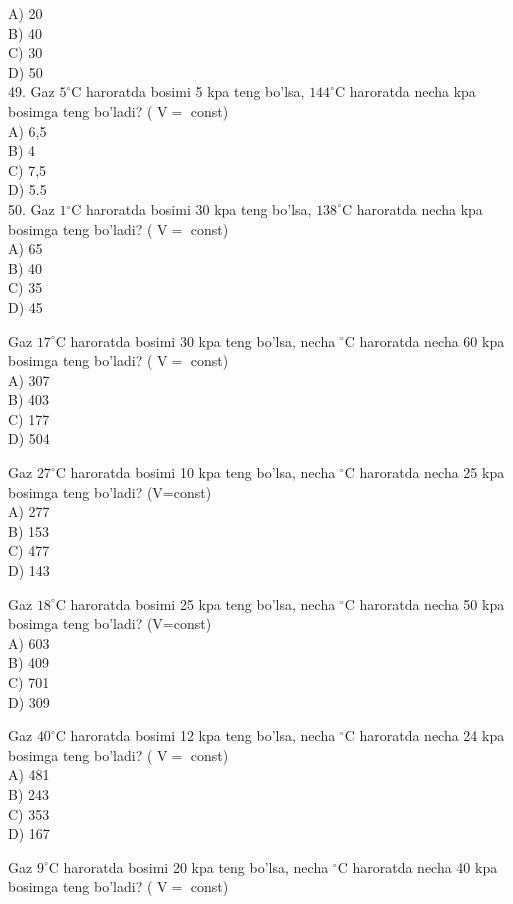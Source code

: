 A) 20\\
B) 40\\
C) 30\\
D) 50\\
49. Gaz $5^{\circ} \mathrm{C}$ haroratda bosimi 5 kpa teng bo'lsa, $144^{\circ} \mathrm{C}$ haroratda necha kpa bosimga teng bo'ladi? ( $\mathrm{V}=$ const)\\
A) 6,5\\
B) 4\\
C) 7,5\\
D) 5.5\\
50. Gaz $1{ }^{\circ} \mathrm{C}$ haroratda bosimi 30 kpa teng bo'lsa, $138^{\circ} \mathrm{C}$ haroratda necha kpa bosimga teng bo'ladi? ( $\mathrm{V}=$ const)\\
A) 65\\
B) 40\\
C) 35\\
D) 45
  \item Gaz $17^{\circ} \mathrm{C}$ haroratda bosimi 30 kpa teng bo'lsa, necha ${ }^{\circ} \mathrm{C}$ haroratda necha 60 kpa bosimga teng bo'ladi? ( $\mathrm{V}=$ const)\\
A) 307\\
B) 403\\
C) 177\\
D) 504\\
  \item Gaz $27^{\circ} \mathrm{C}$ haroratda bosimi 10 kpa teng bo'lsa, necha ${ }^{\circ} \mathrm{C}$ haroratda necha 25 kpa bosimga teng bo'ladi? (V=const)\\
A) 277\\
B) 153\\
C) 477\\
D) 143
  \item Gaz $18^{\circ} \mathrm{C}$ haroratda bosimi 25 kpa teng bo'lsa, necha ${ }^{\circ} \mathrm{C}$ haroratda necha 50 kpa bosimga teng bo'ladi? (V=const)\\
A) 603\\
B) 409\\
C) 701\\
D) 309
  \item Gaz $40^{\circ} \mathrm{C}$ haroratda bosimi 12 kpa teng bo'lsa, necha ${ }^{\circ} \mathrm{C}$ haroratda necha 24 kpa bosimga teng bo'ladi? ( $\mathrm{V}=$ const)\\
A) 481\\
B) 243\\
C) 353\\
D) 167
  \item Gaz $9^{\circ} \mathrm{C}$ haroratda bosimi 20 kpa teng bo'lsa, necha ${ }^{\circ} \mathrm{C}$ haroratda necha 40 kpa bosimga teng bo'ladi? ( $\mathrm{V}=$ const)\\
